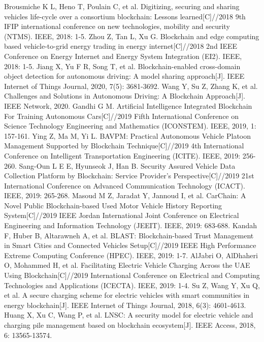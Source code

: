 \begin{thebibliography}{99}
 Brousmiche K L, Heno T, Poulain C, et al. Digitizing, securing and sharing vehicles life-cycle over a consortium blockchain: Lessons learned[C]//2018 9th IFIP international conference on new technologies, mobility and security (NTMS). IEEE, 2018: 1-5.
 Zhou Z, Tan L, Xu G. Blockchain and edge computing based vehicle-to-grid energy trading in energy internet[C]//2018 2nd IEEE Conference on Energy Internet and Energy System Integration (EI2). IEEE, 2018: 1-5.
 Jiang X, Yu F R, Song T, et al. Blockchain-enabled cross-domain object detection for autonomous driving: A model sharing approach[J]. IEEE Internet of Things Journal, 2020, 7(5): 3681-3692.
 Wang Y, Su Z, Zhang K, et al. Challenges and Solutions in Autonomous Driving: A Blockchain Approach[J]. IEEE Network, 2020.
 Gandhi G M. Artificial Intelligence Integrated Blockchain For Training Autonomous Cars[C]//2019 Fifth International Conference on Science Technology Engineering and Mathematics (ICONSTEM). IEEE, 2019, 1: 157-161.
 Ying Z, Ma M, Yi L. BAVPM: Practical Autonomous Vehicle Platoon Management Supported by Blockchain Technique[C]//2019 4th International Conference on Intelligent Transportation Engineering (ICITE). IEEE, 2019: 256-260.
 Sang-Oun L E E, Hyunseok J, Han B. Security Assured Vehicle Data Collection Platform by Blockchain: Service Provider’s Perspective[C]//2019 21st International Conference on Advanced Communication Technology (ICACT). IEEE, 2019: 265-268.
 Masoud M Z, Jaradat Y, Jannoud I, et al. CarChain: A Novel Public Blockchain-based Used Motor Vehicle History Reporting System[C]//2019 IEEE Jordan International Joint Conference on Electrical Engineering and Information Technology (JEEIT). IEEE, 2019: 683-688.
 Kandah F, Huber B, Altarawneh A, et al. BLAST: Blockchain-based Trust Management in Smart Cities and Connected Vehicles Setup[C]//2019 IEEE High Performance Extreme Computing Conference (HPEC). IEEE, 2019: 1-7.
 AlJabri O, AlDhaheri O, Mohammed H, et al. Facilitating Electric Vehicle Charging Across the UAE Using Blockchain[C]//2019 International Conference on Electrical and Computing Technologies and Applications (ICECTA). IEEE, 2019: 1-4.
 Su Z, Wang Y, Xu Q, et al. A secure charging scheme for electric vehicles with smart communities in energy blockchain[J]. IEEE Internet of Things Journal, 2018, 6(3): 4601-4613.
 Huang X, Xu C, Wang P, et al. LNSC: A security model for electric vehicle and charging pile management based on blockchain ecosystem[J]. IEEE Access, 2018, 6: 13565-13574.

\end{thebibliography}
